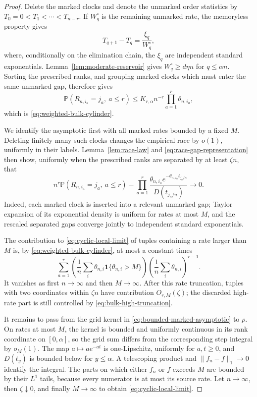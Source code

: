 \documentclass[11pt]{article}
\theoremstyle{remark}
\theoremstyle{plain}
\newcommand{\Pp}{\mathbb P}
\newcommand{\one}{\mathbf 1}
\begin{document}
\begin{proof}
Delete the marked clocks and denote the unmarked order statistics by
$T_0=0<T_1<\cdots<T_{n-r}$.  If $W_q^\circ$ is the remaining unmarked rate,
the memoryless property gives
\begin{equation}\label{eq:race-gap-representation}
 T_{q+1}-T_q=\frac{\xi_q}{W_q^\circ},
\end{equation}
where, conditionally on the elimination chain, the $\xi_q$ are independent
standard exponentials.  Lemma~\ref{lem:moderate-reservoir} gives
$W_q^\circ\ge d\eta n$ for $q\le\alpha n$.  Sorting the prescribed ranks,
and grouping marked clocks which must enter the same unmarked gap, therefore
gives
\[
 \Pp(R_{n,i_a}=j_a,\ a\le r)
 \le K_{r,\alpha}n^{-r}\prod_{a=1}^r\theta_{n,i_a},
\]
which is \eqref{eq:weighted-bulk-cylinder}.

We identify the asymptotic first with all marked rates bounded by a fixed
$M$.  Deleting finitely many such clocks changes the empirical race by
$o(1)$, uniformly in their labels.  Lemma~\ref{lem:race-law} and
\eqref{eq:race-gap-representation} then show, uniformly when the prescribed
ranks are separated by at least $\zeta n$, that
\begin{equation}\label{eq:bounded-marked-asymptotic}
 n^r\Pp(R_{n,i_a}=j_a,\ a\le r)
 -\prod_{a=1}^r
 \frac{\theta_{n,i_a}e^{-\theta_{n,i_a}t_{j_a/n}}}
 {D(t_{j_a/n})}
 \longrightarrow0.
\end{equation}
Indeed, each marked clock is inserted into a relevant unmarked gap; Taylor
expansion of its exponential density is uniform for rates at most $M$, and
the rescaled separated gaps converge jointly to independent standard
exponentials.

The contribution to \eqref{eq:cyclic-local-limit} of tuples containing a
rate larger than $M$ is, by \eqref{eq:weighted-bulk-cylinder}, at most a
constant times
\begin{equation}\label{eq:bulk-high-truncation}
 \sum_{a=1}^r
 \left(\frac1n\sum_i\theta_{n,i}\one\{\theta_{n,i}>M\}\right)
 \left(\frac1n\sum_i\theta_{n,i}\right)^{r-1}.
\end{equation}
It vanishes as first $n\to\infty$ and then $M\to\infty$.  After this rate
truncation, tuples with two coordinates within $\zeta n$ have contribution
$O_{r,M}(\zeta)$; the discarded high-rate part is still controlled by
\eqref{eq:bulk-high-truncation}.

It remains to pass from the grid kernel in
\eqref{eq:bounded-marked-asymptotic} to $\rho$.  On rates at most $M$, the
kernel is bounded and uniformly continuous in its rank coordinate on
$[0,\alpha]$, so the grid sum differs from the corresponding step integral by
$o_M(1)$.  The map $a\mapsto ae^{-at}$ is one-Lipschitz, uniformly for
$a,t\ge0$, and $D(t_y)$ is bounded below for $y\le\alpha$.  A telescoping
product and $\lVert f_n-f\rVert_1\to0$ identify the integral.  The parts on
which either $f_n$ or $f$ exceeds $M$ are bounded by their $L^1$ tails,
because every numerator is at most its source rate.  Let $n\to\infty$, then
$\zeta\downarrow0$, and finally $M\to\infty$ to obtain
\eqref{eq:cyclic-local-limit}.
\end{proof}
\end{document}
